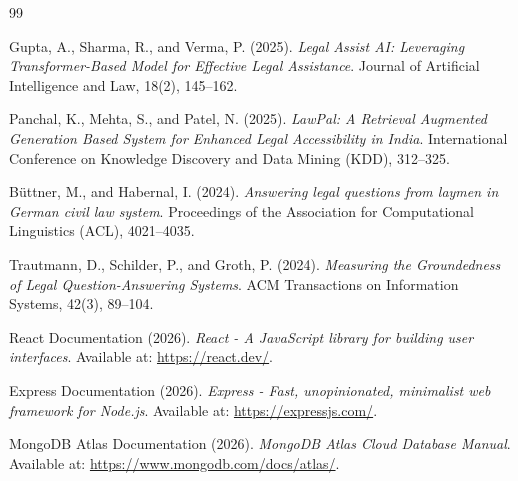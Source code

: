 \documentclass[12pt,a4paper]{report}
\begin{document}
\begin{thebibliography}{99}

Gupta, A., Sharma, R., and Verma, P. (2025).
\textit{Legal Assist AI: Leveraging Transformer-Based Model for Effective Legal Assistance}. Journal of Artificial Intelligence and Law, 18(2), 145--162.

Panchal, K., Mehta, S., and Patel, N. (2025).
\textit{LawPal: A Retrieval Augmented Generation Based System for Enhanced Legal Accessibility in India}. International Conference on Knowledge Discovery and Data Mining (KDD), 312--325.

Büttner, M., and Habernal, I. (2024).
\textit{Answering legal questions from laymen in German civil law system}. Proceedings of the Association for Computational Linguistics (ACL), 4021--4035.

Trautmann, D., Schilder, P., and Groth, P. (2024).
\textit{Measuring the Groundedness of Legal Question-Answering Systems}. ACM Transactions on Information Systems, 42(3), 89--104.

React Documentation (2026).
\textit{React - A JavaScript library for building user interfaces}. Available at: \url{https://react.dev/}.

Express Documentation (2026).
\textit{Express - Fast, unopinionated, minimalist web framework for Node.js}. Available at: \url{https://expressjs.com/}.

MongoDB Atlas Documentation (2026).
\textit{MongoDB Atlas Cloud Database Manual}. Available at: \url{https://www.mongodb.com/docs/atlas/}.

\end{thebibliography}
\end{document}
